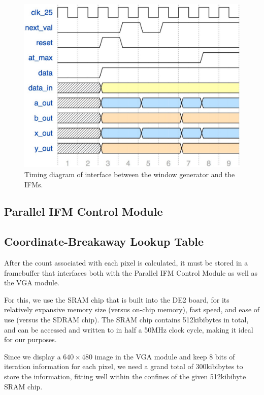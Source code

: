 \documentclass{article}
\begin{document}
\begin{figure}[h!]
  \centering
    \includegraphics[width=\textwidth]{timing_diagrams/gen_ifm.pdf}
  \caption{Timing diagram of interface between the window generator
    and the IFMs.}
\end{figure}



\subsection{Parallel IFM Control Module}




\subsection{Coordinate-Breakaway Lookup Table}

After the count associated with each pixel is calculated, it must be
stored in a framebuffer that interfaces both with the Parallel IFM
Control Module as well as the VGA module.

For this, we use the SRAM chip that is built into the DE2 board, for
its relatively expansive memory size (versus on-chip memory), fast
speed, and ease of use (versus the SDRAM chip). The SRAM chip contains
512kibibytes in total, and can be accessed and written to in half a 50MHz
clock cycle, making it ideal for our purposes.

Since we display a $640\times 480$ image in the VGA module and keep 8
bits of iteration information for each pixel, we need a grand total of
300kibibytes to store the information, fitting well within the
confines of the given 512kibibyte SRAM chip.
\end{document}
